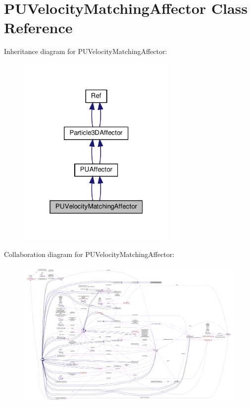 \hypertarget{classPUVelocityMatchingAffector}{}\section{P\+U\+Velocity\+Matching\+Affector Class Reference}
\label{classPUVelocityMatchingAffector}


Inheritance diagram for P\+U\+Velocity\+Matching\+Affector\+:
\nopagebreak
\begin{figure}[H]
\begin{center}
\leavevmode
\includegraphics[width=220pt]{classPUVelocityMatchingAffector__inherit__graph}
\end{center}
\end{figure}


Collaboration diagram for P\+U\+Velocity\+Matching\+Affector\+:
\nopagebreak
\begin{figure}[H]
\begin{center}
\leavevmode
\includegraphics[width=350pt]{classPUVelocityMatchingAffector__coll__graph}
\end{center}
\end{figure}
